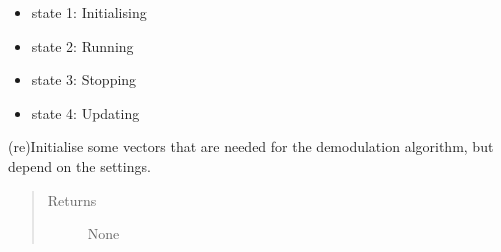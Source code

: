 \documentclass[letterpaper,10pt,english]{sphinxmanual}
\begin{document}
\begin{fulllineitems}
\begin{fulllineitems}
\begin{itemize}
\item {} 
\sphinxAtStartPar
state 1: Initialising

\item {} 
\sphinxAtStartPar
state 2: Running

\item {} 
\sphinxAtStartPar
state 3: Stopping

\item {} 
\sphinxAtStartPar
state 4: Updating

\end{itemize}

\end{fulllineitems}


\begin{fulllineitems}
\label{\detokenize{index:TiePieLCR.TiePieLCR.stop_gen}}
\end{fulllineitems}


\begin{fulllineitems}
\label{\detokenize{index:TiePieLCR.TiePieLCR.stop_measurement}}
\end{fulllineitems}


\begin{fulllineitems}
\label{\detokenize{index:TiePieLCR.TiePieLCR.stop_stream}}
\end{fulllineitems}


\begin{fulllineitems}
\label{\detokenize{index:TiePieLCR.TiePieLCR.update_base_vectors}}
\sphinxAtStartPar
(re)Initialise some vectors that are needed for the demodulation algorithm, but depend on the settings.
\begin{quote}\begin{description}
\item[{Returns}] \leavevmode
\sphinxAtStartPar
None


\end{description}
\end{quote}
\end{fulllineitems}
\end{fulllineitems}
\end{document}
